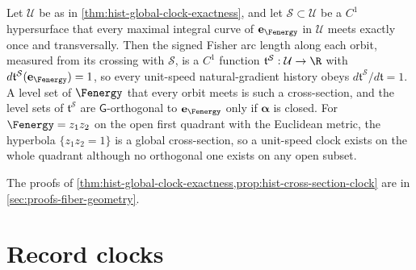 Let $\mathcal U$ be as in \cref{thm:hist-global-clock-exactness}, and let
$\mathcal S\subset\mathcal U$ be a $C^1$ hypersurface that every maximal integral curve
of $\mathbf e_{\Fenergy}$ in $\mathcal U$ meets exactly once and transversally.  Then the
signed Fisher arc length along each orbit, measured from its crossing with $\mathcal S$,
is a $C^1$ function $\mathfrak t^{\mathcal S}:\mathcal U\to\R$ with
$d\mathfrak t^{\mathcal S}(\mathbf e_{\Fenergy})=1$, so every unit-speed natural-gradient
history obeys $d\mathfrak t^{\mathcal S}/d\mathfrak t=1$.  A level set of $\Fenergy$ that
every orbit meets is such a cross-section, and the level sets of
$\mathfrak t^{\mathcal S}$ are $\mathsf G$-orthogonal to $\mathbf e_{\Fenergy}$ only if
$\bm\alpha$ is closed.  For $\Fenergy=z_1z_2$ on the open first quadrant with the
Euclidean metric, the hyperbola $\{z_1z_2=1\}$ is a global cross-section, so a unit-speed
clock exists on the whole quadrant although no orthogonal one exists on any open subset.

The proofs of \cref{thm:hist-global-clock-exactness,prop:hist-cross-section-clock} are in
\cref{sec:proofs-fiber-geometry}.

\section{Record clocks}
\label{sec:hist-record-clocks}

